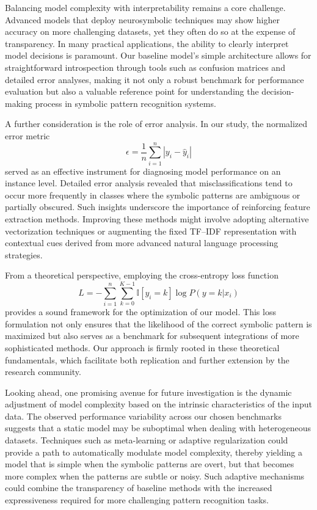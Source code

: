 \documentclass{article}
\begin{document}
Balancing model complexity with interpretability remains a core challenge. Advanced models that deploy neurosymbolic techniques may show higher accuracy on more challenging datasets, yet they often do so at the expense of transparency. In many practical applications, the ability to clearly interpret model decisions is paramount. Our baseline model’s simple architecture allows for straightforward introspection through tools such as confusion matrices and detailed error analyses, making it not only a robust benchmark for performance evaluation but also a valuable reference point for understanding the decision-making process in symbolic pattern recognition systems.

A further consideration is the role of error analysis. In our study, the normalized error metric
\[
\epsilon = \frac{1}{n}\sum_{i=1}^{n} \left| y_i - \hat{y}_i \right|
\]
served as an effective instrument for diagnosing model performance on an instance level. Detailed error analysis revealed that misclassifications tend to occur more frequently in classes where the symbolic patterns are ambiguous or partially obscured. Such insights underscore the importance of reinforcing feature extraction methods. Improving these methods might involve adopting alternative vectorization techniques or augmenting the fixed TF–IDF representation with contextual cues derived from more advanced natural language processing strategies.

From a theoretical perspective, employing the cross-entropy loss function
\[
L = -\sum_{i=1}^{n} \sum_{k=0}^{K-1} \mathbb{I}[y_i=k]\log P(y=k|x_i)
\]
provides a sound framework for the optimization of our model. This loss formulation not only ensures that the likelihood of the correct symbolic pattern is maximized but also serves as a benchmark for subsequent integrations of more sophisticated methods. Our approach is firmly rooted in these theoretical fundamentals, which facilitate both replication and further extension by the research community.

Looking ahead, one promising avenue for future investigation is the dynamic adjustment of model complexity based on the intrinsic characteristics of the input data. The observed performance variability across our chosen benchmarks suggests that a static model may be suboptimal when dealing with heterogeneous datasets. Techniques such as meta-learning or adaptive regularization could provide a path to automatically modulate model complexity, thereby yielding a model that is simple when the symbolic patterns are overt, but that becomes more complex when the patterns are subtle or noisy. Such adaptive mechanisms could combine the transparency of baseline methods with the increased expressiveness required for more challenging pattern recognition tasks.
\end{document}
